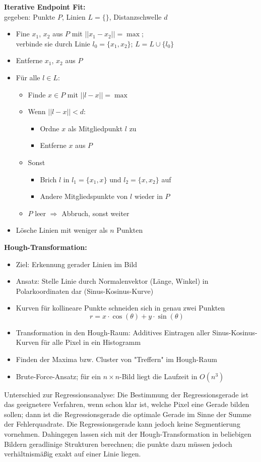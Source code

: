 \textbf{Iterative Endpoint Fit:} \\[0,1cm]
gegeben: Punkte $P$, Linien $L = \{ \}$, Distanzschwelle $d$
\begin{itemize}
\item Fine $x_1$, $x_2$ aus $P$ mit $||x_1 - x_2|| = \max$; \\ verbinde sie durch Linie $l_0 = \{x_1,x_2\}$; $L=L \cup \{l_0\}$
\item Entferne $x_1$, $x_2$ aus $P$
\item Für alle $l \in L$:
\begin{itemize}
\item Finde $x \in P$ mit $||l-x|| = \max$
\item Wenn $||l-x|| < d$:
\begin{itemize}
\item Ordne $x$ als Mitgliedpunkt $l$ zu
\item Entferne $x$ aus $P$
\end{itemize}
\item Sonst
\begin{itemize}
\item Brich $l$ in $l_1 = \{ x_1 , x\}$ und $l_2 = \{x , x_2 \}$ auf
\item Andere Mitgliedspunkte von $l$ wieder in $P$
\end{itemize}
\item $P$ leer $\Rightarrow$ Abbruch, sonst weiter
\end{itemize}
\item Lösche Linien mit weniger als $n$ Punkten
\end{itemize}

\textbf{Hough-Transformation:}
\begin{itemize}
\item Ziel: Erkennung gerader Linien im Bild
\item Ansatz: Stelle Linie durch Normalenvektor (Länge, Winkel) in Polarkoordinaten dar (Sinus-Kosinus-Kurve)
\item Kurven für kollineare Punkte schneiden sich in genau zwei Punkten $$r = x \cdot \cos(\theta) + y \cdot \sin(\theta)$$
\item Transformation in den Hough-Raum: Additives Eintragen aller Sinus-Kosinus-Kurven für alle Pixel in ein Histogramm
\item Finden der Maxima bzw. Cluster von "{}Treffern"{} im Hough-Raum
\item Brute-Force-Ansatz; für ein $n \times n$-Bild liegt die Laufzeit in $O(n^3)$
\end{itemize}
Unterschied zur Regressionsanalyse: Die Bestimmung der Regressionsgerade ist das geeignetere Verfahren, wenn schon klar ist, welche Pixel eine Gerade bilden sollen; dann ist die Regressionsgerade die optimale Gerade im Sinne der Summe der Fehlerquadrate. Die Regressionsgerade kann jedoch keine Segmentierung vornehmen. Dahingegen lassen sich mit der Hough-Transformation in beliebigen Bildern geradlinige Strukturen berechnen; die punkte dazu müssen jedoch verhältnismäßig exakt auf einer Linie liegen.

